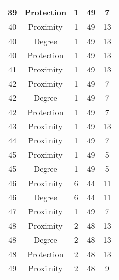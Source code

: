 \documentclass[results.tex]{subfiles}
\begin{document}
\begin{center}
\begin{tabular}{| c || c | c | c | c |}
    \hline
    39 & Protection & 1 & 49 & 7 \\ 
    \hline
    40 & Proximity & 1 & 49 & 13 \\ 
    \hline
    40 & Degree & 1 & 49 & 13 \\ 
    \hline
    40 & Protection & 1 & 49 & 13 \\ 
    \hline
    41 & Proximity & 1 & 49 & 13 \\ 
    \hline
    42 & Proximity & 1 & 49 & 7 \\ 
    \hline
    42 & Degree & 1 & 49 & 7 \\ 
    \hline
    42 & Protection & 1 & 49 & 7 \\ 
    \hline
    43 & Proximity & 1 & 49 & 13 \\ 
    \hline
    44 & Proximity & 1 & 49 & 7 \\ 
    \hline
    45 & Proximity & 1 & 49 & 5 \\ 
    \hline
    45 & Degree & 1 & 49 & 5 \\ 
    \hline
    46 & Proximity & 6 & 44 & 11 \\ 
    \hline
    46 & Degree & 6 & 44 & 11 \\ 
    \hline
    47 & Proximity & 1 & 49 & 7 \\ 
    \hline
    48 & Proximity & 2 & 48 & 13 \\ 
    \hline
    48 & Degree & 2 & 48 & 13 \\ 
    \hline
    48 & Protection & 2 & 48 & 13 \\ 
    \hline
    49 & Proximity & 2 & 48 & 9 \\ 
    \hline   \end{tabular}
\end{center}
\end{document}
